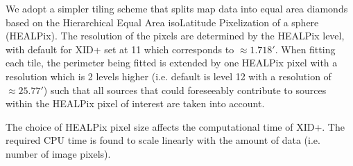 \documentclass[useAMS,usenatbib]{mnras}
\begin{document}
%
%
We adopt a simpler tiling scheme that splits map data into equal area diamonds based on the Hierarchical Equal Area isoLatitude Pixelization of a sphere (HEALPix). The resolution of the pixels are determined by the HEALPix level, with default for \textsc{XID+} set at 11 which corresponds to $\approx 1.718'$. When fitting each tile, the perimeter being fitted is extended by one HEALPix pixel with a resolution which is 2 levels higher (i.e. default is level 12 with a resolution of $\approx 25.77'$) such that all sources that could foreseeably contribute to sources within the HEALPix pixel of interest are taken into account. 


The choice of HEALPix pixel size affects the computational time of \textsc{XID+}. The required CPU time is found to scale linearly with the amount of data (i.e. number of image pixels).%
\end{document}
